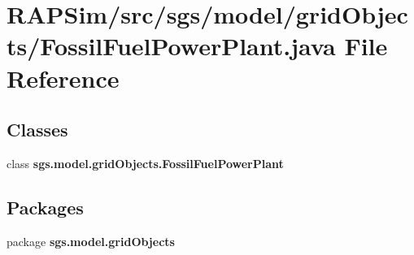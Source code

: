 \section{R\-A\-P\-Sim/src/sgs/model/grid\-Objects/\-Fossil\-Fuel\-Power\-Plant.java File Reference}
\label{_fossil_fuel_power_plant_8java}
\subsection*{Classes}
\begin{DoxyCompactItemize}
\item 
class {\bf sgs.\-model.\-grid\-Objects.\-Fossil\-Fuel\-Power\-Plant}
\end{DoxyCompactItemize}
\subsection*{Packages}
\begin{DoxyCompactItemize}
\item 
package {\bf sgs.\-model.\-grid\-Objects}
\end{DoxyCompactItemize}
